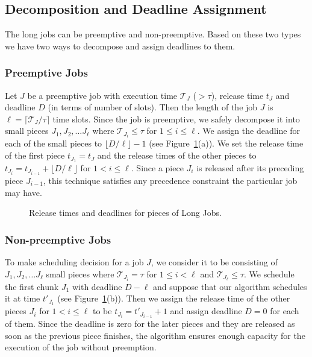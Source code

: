 \documentclass[10pt,conference,compsocconf,letterpaper]{IEEEtran}
\begin{document}
\subsection{Decomposition and Deadline Assignment}
The long jobs can be preemptive and non-preemptive. Based on these two types we have two ways to decompose and assign deadlines to them.

\subsubsection*{Preemptive Jobs}
Let $J$ be a preemptive job with execution time $\mathcal{T}_J$ ($>\tau$), release time $t_J$ and deadline $D$ (in terms of number of slots). Then the length of the job $J$ is $\ell = \lceil \mathcal{T}_J/\tau \rceil$ time slots. Since the job is preemptive, we safely decompose it into small pieces $J_1, J_2, \ldots J_\ell$ where $\mathcal{T}_{J_i}\le \tau$ for $1\le i\le \ell$. We assign the deadline for each of the small pieces to $\lfloor D/\ell \rfloor-1$ (see Figure~\ref{fig:longjob}(a)). We set the release time of the first piece $t_{J_1} = t_J$ and the release times of the other pieces to $t_{J_i} = t_{J_{i-1}}+\lfloor D/\ell \rfloor$ for $1<i\le \ell$. Since a piece $J_{i}$ is released after its preceding piece $J_{i-1}$, this technique satisfies any precedence constraint the particular job may have.


\begin{figure}[!ht]
\centerline{
\hfil
{}}
\caption{Release times and deadlines for pieces of Long Jobs.}
\label{fig:longjob}
\end{figure}














\subsubsection*{Non-preemptive Jobs}
To make scheduling decision for a job $J$, we consider it to be consisting of $J_1, J_2, \ldots J_\ell$ small pieces where $\mathcal{T}_{J_i}= \tau$ for $1\le i< \ell$ and $\mathcal{T}_{J_\ell}\le \tau$. We schedule the first chunk $J_1$ with deadline $D-\ell$ and suppose that our algorithm schedules it at time $t'_{J_1}$ (see Figure~\ref{fig:longjob}(b)). Then we assign the release time of the other pieces $J_i$ for $1<i\le \ell$ to be $t_{J_i} = t'_{J_{i-1}}+1$ and assign deadline $D= 0$ for each of them. Since the deadline is zero for the later pieces and they are released as soon as the previous piece finishes, the algorithm ensures enough capacity for the execution of the job without preemption.
\end{document}
